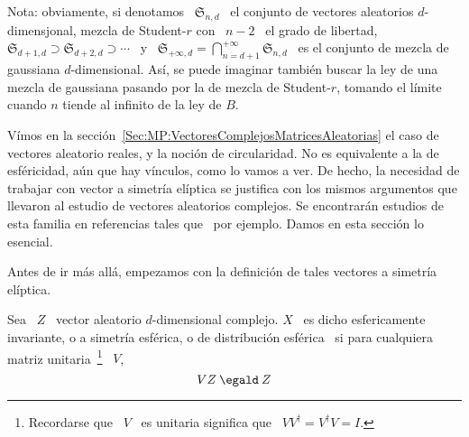 Nota: obviamente, si denotamos \  $\mathfrak{S}_{n,d}$ \ el conjunto de vectores
aleatorios  $d$-dimensjonal, mezcla de  Student-$r$ con  \ $n-2$  \ el  grado de
libertad, $\mathfrak{S}_{d+1,d} \supset \mathfrak{S}_{d+2,d} \supset \cdots$ \ y
\    $\displaystyle    \mathfrak{S}_{+\infty,d}   =    \bigcap_{n=d+1}^{+\infty}
\mathfrak{S}_{n,d}$    \   es    el    conjunto   de    mezcla   de    gaussiana
$d$-dimensional. As\'i, se puede imaginar  tambi\'en buscar la ley de una mezcla
de gaussiana pasando por la de mezcla de Student-$r$, tomando el l\'imite cuando
$n$ tiende al infinito de la ley de $B$.



\label{Ssec:MP:FamiliaElipticaCompleja}


V\'imos en la secci\'on~\ref{Sec:MP:VectoresComplejosMatricesAleatorias} el caso
de vectores aleatorio reales, y la noci\'on de circularidad. No es equivalente a
la de esf\'ericidad, a\'un que hay v\'inculos, como lo vamos a ver. De hecho, la
necesidad de  trabajar con vector a  simetr\'ia el\'iptica se  justifica con los
mismos argumentos que  llevaron al estudio de vectores  aleatorios complejos. Se
encontrar\'an  estudios de  esta familia  en referencias  tales que~\cite{Kri76,
  KriLin86,   MicDey06,  OllEri11,   OllTyl12,  FanKot90,   BesAbr13,  BauPas07,
  ChiPas08} por ejemplo. Damos en esta secci\'on lo esencial.

Antes de  ir m\'as  all\'a, empezamos  con la definici\'on  de tales  vectores a
simetr\'ia el\'iptica.
%
\begin{definicion}
  Sea  \  $Z$ \  vector  aleatorio $d$-dimensional  complejo.   $X$  \ es  dicho
  esfericamente  invariante,  o a  simetr\'ia  esf\'erica,  o de  distribuci\'on
  esf\'erica \ si para cualquiera matriz unitaria~\footnote{Recordarse que \ $V$
    \ es unitaria significa que \ $V V^\dag = V^\dag V = I$.} \ $V$,
  \[
  V  Z  \: \egald  \: Z
  \]
\end{definicion}

